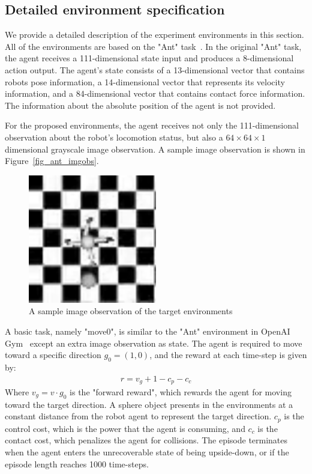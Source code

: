 
\subsection{Detailed environment specification}
We provide a detailed description of the experiment environments in this section. All of the environments are based on the "Ant" task~\cite{openaigym}. In the original "Ant" task, the agent receives a 111-dimensional state input and produces a 8-dimensional action output. The agent's state consists of a 13-dimensional vector that contains robots pose information, a 14-dimensional vector that represents its velocity information, and a 84-dimensional vector that contains contact force information. The information about the absolute position of the agent is not provided.

For the proposed environments, the agent receives not only the 111-dimensional observation about the robot's locomotion status, but also a $64\times 64\times 1$ dimensional grayscale image observation. A sample image observation is shown in Figure~\ref{fig_ant_imgobs}.

\begin{figure}[H]
	\includegraphics[width=0.5\textwidth]{images/ant_imgobs.png}
	\centering
	\caption{A sample image observation of the target environments}
\end{figure}\label{fig_ant_imgobs}

A basic task, namely "move0", is similar to the "Ant" environment in OpenAI Gym~\cite{openaigym} except an extra image observation as state. The agent is required to move toward a specific direction $g_0=(1,0)$, and the reward at each time-step is given by:
\begin{align}
r = v_g + 1-c_p-c_c
\end{align}
Where $v_g=v \cdot g_0$ is the "forward reward", which rewards the agent for moving toward the target direction. A sphere object presents in the environments at a constant distance from the robot agent to represent the target direction.  $c_p$ is the control cost, which is the power that the agent is consuming, and $c_c$ is the contact cost, which penalizes the agent for collisions. The episode terminates when the agent enters the unrecoverable state of being upside-down, or if the episode length reaches 1000 time-steps.

